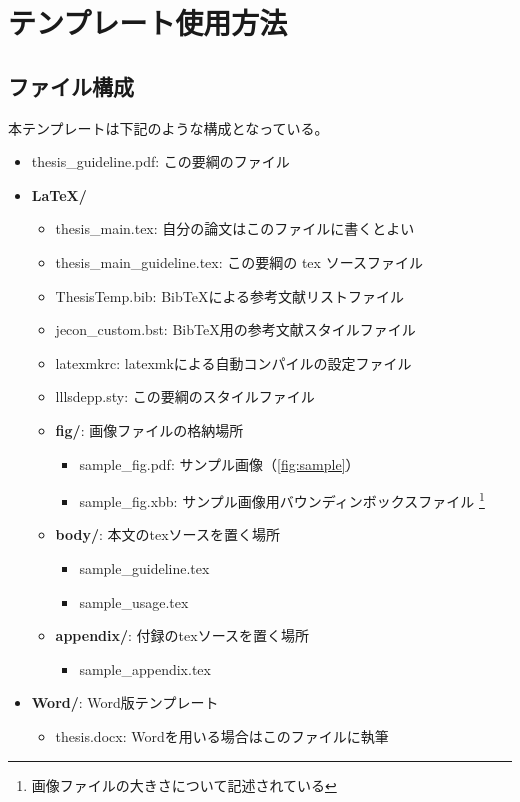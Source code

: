 
\chapter{テンプレート使用方法}
	\label{chp:readme}

	\section{ファイル構成}
	  \label{sec:contents}

		本テンプレートは下記のような構成となっている。

		\begin{itemize}
			\ttfamily
			\item thesis\_guideline.pdf: この要綱のファイル
			\item \textbf{LaTeX/}
			\begin{itemize}
			  \item thesis\_main.tex: 自分の論文はこのファイルに書くとよい
			  \item thesis\_main\_guideline.tex: この要綱の tex ソースファイル
				\item ThesisTemp.bib: BibTeXによる参考文献リストファイル
				\item jecon\_custom.bst: BibTeX用の参考文献スタイルファイル
				\item latexmkrc: latexmkによる自動コンパイルの設定ファイル
			  \item lllsdepp.sty: この要綱のスタイルファイル
			  \item \textbf{fig/}: 画像ファイルの格納場所
			    \begin{itemize}
						\item sample\_fig.pdf: サンプル画像（\cref{fig:sample}）
						\item sample\_fig.xbb: サンプル画像用バウンディンボックスファイル
							\footnote{画像ファイルの大きさについて記述されている}
			    \end{itemize}
				\item \textbf{body/}: 本文のtexソースを置く場所
			    \begin{itemize}
						\item sample\_guideline.tex
						\item sample\_usage.tex
			    \end{itemize}
			  \item \textbf{appendix/}: 付録のtexソースを置く場所
			    \begin{itemize}
				    \item sample\_appendix.tex
			    \end{itemize}
		  \end{itemize}
			\item \textbf{Word/}: Word版テンプレート
			  \begin{itemize}
				  \item thesis.docx: Wordを用いる場合はこのファイルに執筆
			  \end{itemize}
		\end{itemize}

